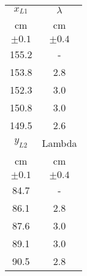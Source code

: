 \begin{table}[H]
\begin{center}
\begin{tabular}{|c|c|}
\hline
    $ x_{L1} $	&	$\lambda$	\\
    cm	&	cm	\\
    $ \pm 0.1 $	&	$ \pm 0.4 $	\\ \hline
    155.2	&	-	\\
    153.8	&	2.8	\\
    152.3	&	3.0	\\
    150.8	&	3.0	\\
    149.5	&	2.6	\\ \hline
    $ y_{L2}$	&	Lambda	\\
    cm	&	cm	\\
    $ \pm 0.1 $	&	$ \pm 0.4 $	\\ \hline
    84.7	&	-	\\
    86.1	&	2.8	\\
    87.6	&	3.0	\\
    89.1	&	3.0	\\
    90.5	&	2.8	\\ \hline
\end{tabular}
\end{center}
\end{table}